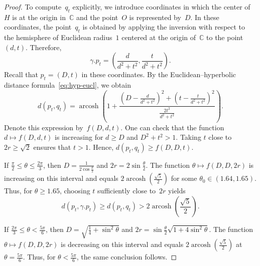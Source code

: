 \documentclass[10pt,a4paper]{amsart}
\newcommand\C {{\mathbb C}}
\DeclareMathOperator{\arcosh}{arcosh}
\begin{document}
\begin{proof}
To compute~$q_t$ explicitly, we introduce coordinates in which the center of~$H$ is at the origin in~$\C$ and the point~$O$ is represented by~$D$.
In these coordinates, the point~$q_t$ is obtained by applying the inversion with respect to the hemisphere of Euclidean radius~$1$ centered at the origin of~$\C$ to the point~$(d,t)$.
Therefore,
\[
\gamma.p_t = \left( \frac{d}{d^2+t^2}, \frac{t}{d^2+t^2} \right).
\]
Recall that $p_t=(D,t)$ in these coordinates.
By the Euclidean--hyperbolic distance formula~\eqref{eq:hyp-eucl}, we obtain
\[
d(p_t,q_t) = \arcosh \left( 1+\frac{\left( D - \frac{d}{d^2+t^2} \right)^2 + \left( t - \frac{t}{d^2+t^2} \right)^2}{\frac{2 t^2}{d^2+t^2}} \right).
\]
Denote this expression by~$f(D,d,t)$.
One can check that the function $d \mapsto f(D,d,t)$ is increasing for $d \geq D$ and $D^2+t^2 >1$.
Taking $t$ close to~$2r \geq \sqrt{2}$ ensures that $t>1$.
Hence, $d(p_t,q_t) \geq f(D,D,t)$.

\medskip

If $\frac{\pi}{2} \leq \theta \leq \frac{2\pi}{3}$, then $D=\frac{1}{2 \cos \frac{\theta}{2}}$ and $2r = 2 \sin \frac{\theta}{2}$.
The function $\theta \mapsto f(D,D,2r)$ is increasing on this interval and equals $2 \arcosh(\frac{\sqrt{5}}{2})$ for some $\theta_0 \in (1.64,1.65)$.
Thus, for $\theta \geq 1.65$, choosing $t$ sufficiently close to~$2r$ yields
\[
d(p_t,\gamma.p_t) \geq d(p_t,q_t) > 2 \arcosh \left( \frac{\sqrt{5}}{2} \right).
\]

If $\frac{2\pi}{3} \leq \theta < \frac{5\pi}{6}$, then $D=\sqrt{\frac{1}{4} + \sin^2 \theta}$ and $2r = \sin \frac{\theta}{2} \sqrt{1+ 4 \sin^2 \theta}$.
The function $\theta \mapsto f(D,D,2r)$ is decreasing on this interval and equals $2 \arcosh(\frac{\sqrt{5}}{2})$ at $\theta = \frac{5\pi}{6}$.
Thus, for $\theta<\frac{5\pi}{6}$, the same conclusion follows.
\end{proof}
\end{document}
